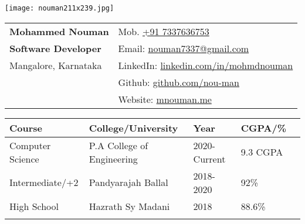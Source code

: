 \documentclass[10pt,article]{article}
\newcommand{\resheading}[1]{{\small \colorbox{mygrey} { \begin{minipage}{0.99\textwidth}\centering{\textbf{#1 \vphantom{p\^{E}}}}\end{minipage}}}}
\begin{document}
\begin{table}
    \begin{minipage}{0\linewidth}
        \centering
        \texttt{[image: nouman211x239.jpg]}
    \end{minipage}
    \begin{minipage}{0.9\linewidth}
        \setlength{\tabcolsep}{70pt}
        \def\arraystretch{1.1}
        \begin{tabular}{ll}
            \textbf{\Large{Mohammed Nouman}}  &  {Mob. \href{tel:+91 7337636753}{+91 7337636753}} \\
            \textbf{Software Developer} &    {Email: \href{mailto:nouman7337@gmail.com}{nouman7337@gmail.com}} \\
            {Mangalore, Karnataka}  & {LinkedIn: \href{https://linkedin.com/in/mohmdnouman}{linkedin.com/in/mohmdnouman}}\\
            {} & {Github: \href{https://github.com/nou-man}{github.com/nou-man}}\\
            {} & {Website: \href{https://mnouman.me}{mnouman.me}}
        \end{tabular}
    \end{minipage}\hfill
\end{table}

\setlength{\tabcolsep}{32pt}
\begin{table}
\centering
\begin{tabular}{lllll}
\toprule
\toprule
\textbf{Course}    & \textbf{College/University}     & \textbf{Year}     & \textbf{CGPA/\%} \\ 
\toprule
Computer Science & P.A College of Engineering  & 2020-Current   & 9.3 CGPA\\ 
Intermediate/+2      & Pandyarajah Ballal & 2018-2020 & 92\%  \\ 
High School      & Hazrath Sy Madani & 2018 & 88.6\%   \\ 
\bottomrule
\bottomrule \\[-0.9cm]
\end{tabular}
\end{table}

\end{document}

